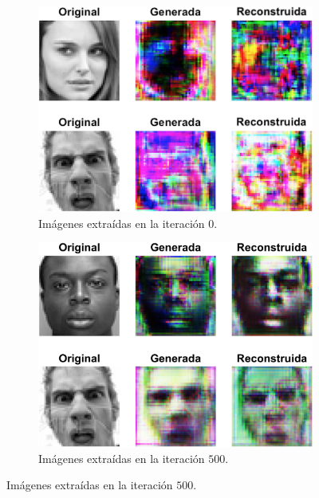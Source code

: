 \begin{figure}
    \centering
    \begin{subfigure}[t]{.45\textwidth}
      \centering
      \includegraphics[width=\linewidth]{Images/CycleGAN_0.png}
      \caption{Imágenes extraídas en la iteración $0$.}
      \label{fig:CycleGAN_0}
    \end{subfigure}
    \hfill
    \begin{subfigure}[t]{.45\textwidth}
      \centering
      \includegraphics[width=\linewidth]{Images/CycleGAN_500.png}
      \caption{Imágenes extraídas en la iteración $500$.}
      \label{fig:CycleGAN_500}
    \end{subfigure}
    

\end{figure}
